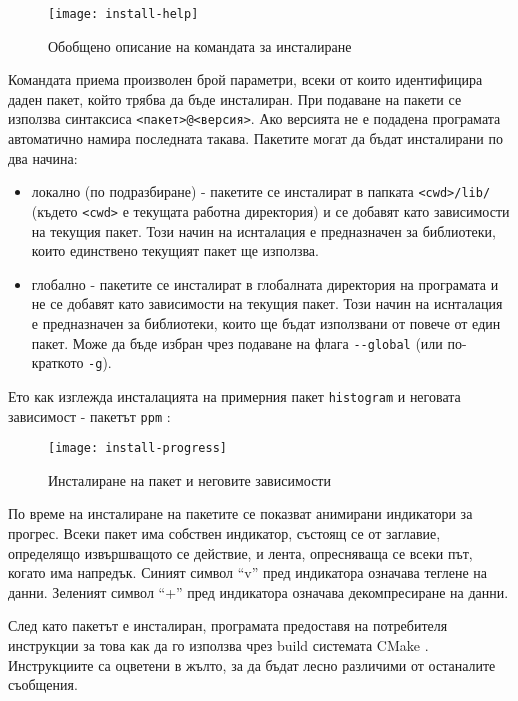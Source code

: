 \begin{figure}[h]
    \centering
    \texttt{[image: install-help]}
    \caption{Обобщено описание на командата за инсталиране}
    \label{fig:install-help}
\end{figure}

Командата приема произволен брой параметри, всеки от които идентифицира даден
пакет, който трябва да бъде инсталиран. При подаване на пакети се използва
синтаксиса \texttt{<пакет>@<версия>}. Ако версията не е подадена програмата автоматично
намира последната такава. Пакетите могат да бъдат инсталирани по два начина:

\begin{itemize}
    \item локално (по подразбиране) - пакетите се инсталират в папката
          \texttt{<cwd>/lib/} (където \texttt{<cwd>} е текущата работна
          директория) и се добавят като зависимости на текущия пакет.
          Този начин на иснталация е предназначен за библиотеки, които
          единствено текущият пакет ще използва.
    \item глобално - пакетите се инсталират в глобалната директория на
          програмата и не се добавят като зависимости на текущия пакет. Този
          начин на иснталация е предназначен за библиотеки, които ще бъдат
          използвани от повече от един пакет. Може да бъде избран чрез подаване
          на флага \texttt{-{}-global} (или по-краткото \texttt{-g}).
\end{itemize}

Ето как изглежда инсталацията на примерния пакет \texttt{histogram} и неговата
зависимост - пакетът \texttt{ppm} :

\begin{figure}[H]
    \centering
    \texttt{[image: install-progress]}
    \caption{Инсталиране на пакет и неговите зависимости}
    \label{fig:install-progress}
\end{figure}

По време на инсталиране на пакетите се показват анимирани индикатори за прогрес.
Всеки пакет има собствен индикатор, състоящ се от заглавие, определящо
извършващото се действие, и лента, опресняваща се всеки път, когато има
напредък. Синият символ ``v'' пред индикатора означава теглене на данни.
Зеленият символ ``+'' пред индикатора означава декомпресиране на данни.

След като пакетът е инсталиран, програмата предоставя на потребителя инструкции
за това как да го използва чрез build системата CMake .
Инструкциите са оцветени в жълто, за да бъдат лесно различими от останалите
съобщения.

